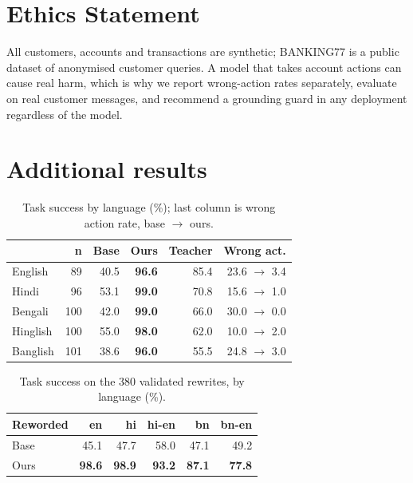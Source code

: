 \documentclass[11pt]{article}
\begin{document}
\section*{Ethics Statement}

All customers, accounts and transactions are synthetic; BANKING77 is a public dataset of anonymised customer queries.
A model that takes account actions can cause real harm, which is why we report wrong-action rates separately, evaluate
on real customer messages, and recommend a grounding guard in any deployment regardless of the model.



\appendix

\section{Additional results}
\label{app:tables}

\begin{table}[h]
\centering
\small
\setlength{\tabcolsep}{3pt}
\begin{tabular}{lrrrrr}
\toprule
 & n & Base & \textbf{Ours} & Teacher & Wrong act. \\
\midrule
English & 89 & 40.5 & \textbf{96.6} & 85.4 & 23.6 $\rightarrow$ 3.4 \\
Hindi & 96 & 53.1 & \textbf{99.0} & 70.8 & 15.6 $\rightarrow$ 1.0 \\
Bengali & 100 & 42.0 & \textbf{99.0} & 66.0 & 30.0 $\rightarrow$ 0.0 \\
Hinglish & 100 & 55.0 & \textbf{98.0} & 62.0 & 10.0 $\rightarrow$ 2.0 \\
Banglish & 101 & 38.6 & \textbf{96.0} & 55.5 & 24.8 $\rightarrow$ 3.0 \\
\bottomrule
\end{tabular}
\caption{Task success by language (\%); last column is wrong action rate, base $\rightarrow$ ours.}
\end{table}

\begin{table}[h]
\centering
\small
\setlength{\tabcolsep}{3pt}
\begin{tabular}{lrrrrr}
\toprule
Reworded & en & hi & hi-en & bn & bn-en \\
\midrule
Base & 45.1 & 47.7 & 58.0 & 47.1 & 49.2 \\
Ours & \textbf{98.6} & \textbf{98.9} & \textbf{93.2} & \textbf{87.1} & \textbf{77.8} \\
\bottomrule
\end{tabular}
\caption{Task success on the 380 validated rewrites, by language (\%).}
\end{table}
\end{document}
